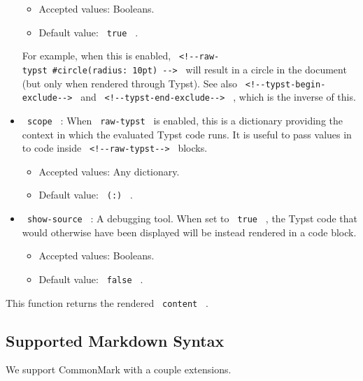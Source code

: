 \begin{itemize}
  \begin{itemize}
  \tightlist
  \item
    Accepted values: Booleans.
  \item
    Default value: \texttt{\ true\ } .
  \end{itemize}

  For example, when this is enabled,
  \texttt{\ \textless{}!-\/-raw-typst\ \#circle(radius:\ 10pt)\ -\/-\textgreater{}\ }
  will result in a circle in the document (but only when rendered
  through Typst). See also
  \texttt{\ \textless{}!-\/-typst-begin-exclude-\/-\textgreater{}\ } and
  \texttt{\ \textless{}!-\/-typst-end-exclude-\/-\textgreater{}\ } ,
  which is the inverse of this.
\item
  \texttt{\ scope\ } : When \texttt{\ raw-typst\ } is enabled, this is a
  dictionary providing the context in which the evaluated Typst code
  runs. It is useful to pass values in to code inside
  \texttt{\ \textless{}!-\/-raw-typst-\/-\textgreater{}\ } blocks.

  \begin{itemize}
  \tightlist
  \item
    Accepted values: Any dictionary.
  \item
    Default value: \texttt{\ (:)\ } .
  \end{itemize}
\item
  \texttt{\ show-source\ } : A debugging tool. When set to
  \texttt{\ true\ } , the Typst code that would otherwise have been
  displayed will be instead rendered in a code block.

  \begin{itemize}
  \tightlist
  \item
    Accepted values: Booleans.
  \item
    Default value: \texttt{\ false\ } .
  \end{itemize}
\end{itemize}

This function returns the rendered \texttt{\ content\ } .

\subsection{Supported Markdown Syntax}\label{supported-markdown-syntax}

We support CommonMark with a couple extensions.

